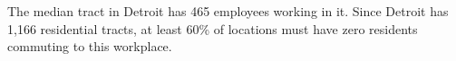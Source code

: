 The median tract in Detroit has 465 employees working in it. Since Detroit has 1,166 residential tracts, at least 60\% of locations must have zero residents commuting to this workplace.

